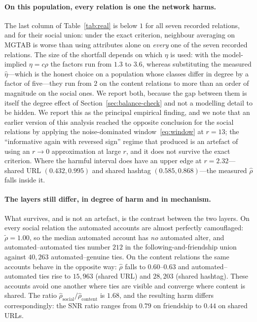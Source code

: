 \documentclass[onecolumn,pdflatex,sn-basic,Numbered]{sn-jnl}
\theoremstyle{thmstyleone}
\theoremstyle{thmstylethree}
\begin{document}
\paragraph{On this population, every relation is one the network harms.}
The last column of Table~\ref{tab:real} is below $1$ for all seven recorded relations, and for their social union: under
the exact criterion, neighbour averaging on MGTAB is worse than using attributes alone
on \emph{every} one of the seven recorded relations. The size of the shortfall depends
on which $\eta$ is used: with the model-implied $\eta = c\rho$ the factors run from
$1.3$ to $3.6$, whereas substituting the measured $\hat\eta$---which is the honest
choice on a population whose classes differ in degree by a factor of five---they run from
$2$ on the content relations to more than an order of magnitude on the social ones. We
report both, because the gap between them is itself the degree effect of
Section~\ref{sec:balance-check} and not a modelling detail to be hidden. We report this
as the principal empirical finding, and we note that an earlier version of this
analysis reached the opposite conclusion for the social relations by applying the
noise-dominated window~\eqref{eq:window} at $r = 13$; the ``informative again with
reversed sign'' regime that produced is an artefact of using an $r \to 0$
approximation at large $r$, and it does not survive the exact criterion. Where the
harmful interval does have an upper edge at $r = 2.32$---shared URL $(0.432, 0.995)$
and shared hashtag $(0.585, 0.868)$---the measured $\hat\rho$ falls inside it.

\paragraph{The layers still differ, in degree of harm and in mechanism.}
What survives, and is not an artefact, is the contrast between the two layers.
On every social relation the automated accounts are almost perfectly camouflaged:
$\tilde\rho = 1.00$, so the median automated account has \emph{no} automated alter,
and automated--automated ties number $212$ in the following-and-friendship union
against $40{,}263$ automated--genuine ties. On the content relations the same accounts
behave in the opposite way: $\hat\rho$ falls to $0.60$--$0.63$ and
automated--automated ties rise to $15{,}963$ (shared URL) and $28{,}203$ (shared
hashtag). These accounts avoid one another where ties are visible and converge where
content is shared. The ratio $\hat\rho_{\text{social}}/\hat\rho_{\text{content}}$ is
$1.68$, and the resulting harm differs correspondingly: the SNR ratio ranges from
$0.79$ on friendship to $0.44$ on shared URLs.
\end{document}
